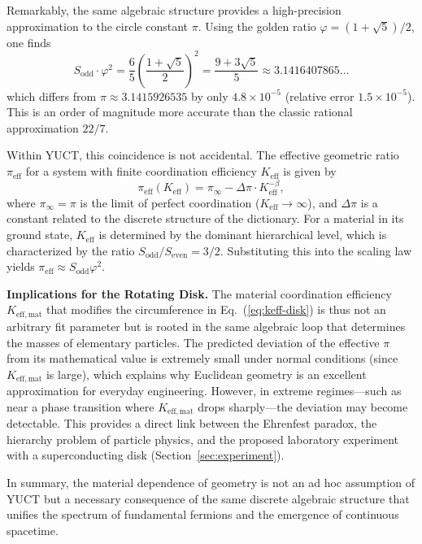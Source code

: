 \documentclass[12pt,a4paper]{article}
\begin{document}
	Remarkably, the same algebraic structure provides a high-precision approximation to the circle constant \(\pi\). Using the golden ratio \(\varphi = (1+\sqrt{5})/2\), one finds
	\begin{equation}
	S_{\mathrm{odd}} \cdot \varphi^2 = \frac{6}{5} \left( \frac{1+\sqrt{5}}{2} \right)^2 
	= \frac{9+3\sqrt{5}}{5} \approx 3.1416407865\dots
	\end{equation}
	which differs from \(\pi \approx 3.1415926535\) by only \(4.8\times10^{-5}\) (relative error \(1.5\times10^{-5}\)). This is an order of magnitude more accurate than the classic rational approximation \(22/7\).

	Within YUCT, this coincidence is not accidental. The effective geometric ratio \(\pi_{\mathrm{eff}}\) for a system with finite coordination efficiency \(K_{\mathrm{eff}}\) is given by
	\begin{equation}
	\pi_{\mathrm{eff}}(K_{\mathrm{eff}}) = \pi_{\infty} - \Delta\pi \cdot K_{\mathrm{eff}}^{-\beta},
	\end{equation}
	where \(\pi_{\infty} = \pi\) is the limit of perfect coordination (\(K_{\mathrm{eff}} \to \infty\)), and \(\Delta\pi\) is a constant related to the discrete structure of the dictionary. For a material in its ground state, \(K_{\mathrm{eff}}\) is determined by the dominant hierarchical level, which is characterized by the ratio \(S_{\mathrm{odd}}/S_{\mathrm{even}} = 3/2\). Substituting this into the scaling law yields \(\pi_{\mathrm{eff}} \approx S_{\mathrm{odd}}\varphi^2\).

	\textbf{Implications for the Rotating Disk.} 
	The material coordination efficiency \(K_{\mathrm{eff,mat}}\) that modifies the circumference in Eq.~(\ref{eq:keff-disk}) is thus not an arbitrary fit parameter but is rooted in the same algebraic loop that determines the masses of elementary particles. The predicted deviation of the effective \(\pi\) from its mathematical value is extremely small under normal conditions (since \(K_{\mathrm{eff,mat}}\) is large), which explains why Euclidean geometry is an excellent approximation for everyday engineering. However, in extreme regimes—such as near a phase transition where \(K_{\mathrm{eff,mat}}\) drops sharply—the deviation may become detectable. This provides a direct link between the Ehrenfest paradox, the hierarchy problem of particle physics, and the proposed laboratory experiment with a superconducting disk (Section~\ref{sec:experiment}).

	In summary, the material dependence of geometry is not an ad hoc assumption of YUCT but a necessary consequence of the same discrete algebraic structure that unifies the spectrum of fundamental fermions and the emergence of continuous spacetime.
\end{document}
